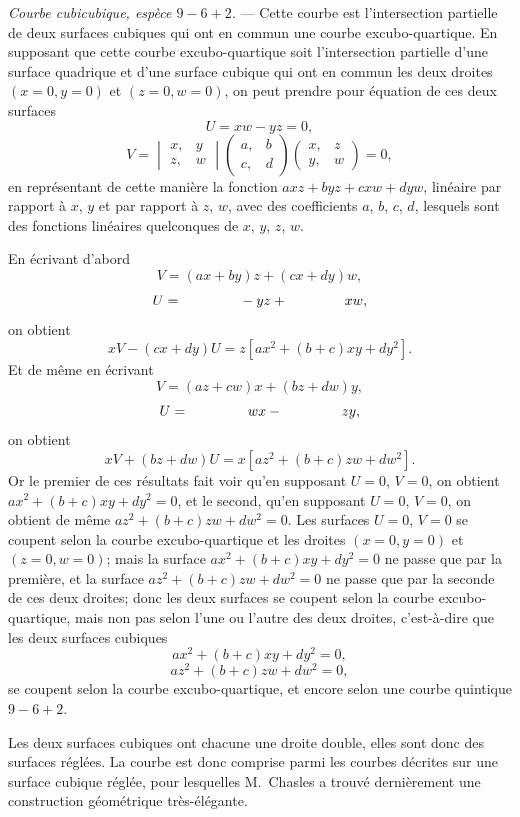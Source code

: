 \documentclass[11pt,a4paper]{article}
\begin{document}
\medskip
\noindent\textit{Courbe cubicubique, esp\`{e}ce $9 - 6 + 2$.} --- Cette courbe est l'intersection partielle de deux surfaces cubiques qui ont en commun une courbe excubo-quartique. En supposant que cette courbe excubo-quartique soit l'intersection partielle d'une surface quadrique et d'une surface cubique qui ont en commun les deux droites $(x = 0, y = 0)$ et $(z = 0, w = 0)$, on peut prendre pour \'{e}quation de ces deux surfaces
\[
U = xw - yz = 0,
\]
\[
V = \begin{vmatrix} x, & y \\ z, & w \end{vmatrix} \begin{pmatrix} a, & b \\ c, & d \end{pmatrix} \begin{pmatrix} x, & z \\ y, & w \end{pmatrix} = 0,
\]
en repr\'{e}sentant de cette mani\`{e}re la fonction $axz + byz + cxw + dyw$, lin\'{e}aire par rapport \`{a} $x$, $y$ et par rapport \`{a} $z$, $w$, avec des coefficients $a$, $b$, $c$, $d$, lesquels sont des fonctions lin\'{e}aires quelconques de $x$, $y$, $z$, $w$.

En \'{e}crivant d'abord
\[
V = (ax + by) z + (cx + dy) w,
\]
\[
U = \hphantom{(ax + by)} - yz + \hphantom{(cx + dy)} xw,
\]
on obtient
\[
xV - (cx + dy) U = z [ax^2 + (b+c)xy + dy^2].
\]
Et de m\^{e}me en \'{e}crivant
\[
V = (az + cw) x + (bz + dw) y,
\]
\[
U = \hphantom{(az + cw)} wx - \hphantom{(bz + dw)} zy,
\]
on obtient
\[
xV + (bz + dw) U = x [az^2 + (b+c)zw + dw^2].
\]
Or le premier de ces r\'{e}sultats fait voir qu'en supposant $U = 0$, $V = 0$, on obtient $ax^2 + (b+c)xy + dy^2 = 0$, et le second, qu'en supposant $U = 0$, $V = 0$, on obtient de m\^{e}me $az^2 + (b+c)zw + dw^2 = 0$. Les surfaces $U = 0$, $V = 0$ se coupent selon la courbe excubo-quartique et les droites $(x = 0, y = 0)$ et $(z = 0, w = 0)$; mais la surface $ax^2 + (b+c)xy + dy^2 = 0$ ne passe que par la premi\`{e}re, et la surface $az^2 + (b+c)zw + dw^2 = 0$ ne passe que par la seconde de ces deux droites; donc les deux surfaces se coupent selon la courbe excubo-quartique, mais non pas selon l'une ou l'autre des deux droites, c'est-\`{a}-dire que les deux surfaces cubiques
\[
ax^2 + (b+c)xy + dy^2 = 0,
\]
\[
az^2 + (b+c)zw + dw^2 = 0,
\]
se coupent selon la courbe excubo-quartique, et encore selon une courbe quintique $9 - 6 + 2$.

Les deux surfaces cubiques ont chacune une droite double, elles sont donc des surfaces r\'{e}gl\'{e}es. La courbe est donc comprise parmi les courbes d\'{e}crites sur une surface cubique r\'{e}gl\'{e}e, pour lesquelles M.~Chasles a trouv\'{e} derni\`{e}rement une construction g\'{e}om\'{e}trique tr\`{e}s-\'{e}l\'{e}gante.
\end{document}
